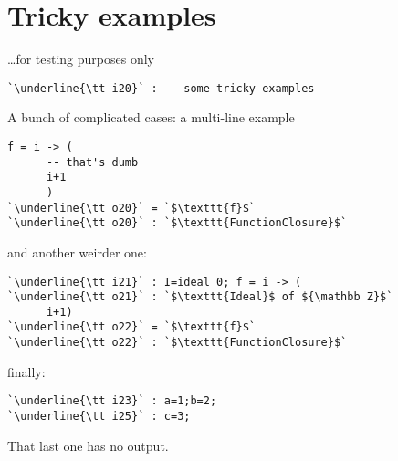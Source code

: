 \documentclass[12pt,a4paper]{amsart}
\begin{document}
\section{Tricky examples}
\dots for testing purposes only
\begin{lstlisting}[language=Macaulay2output]
`\underline{\tt i20}` : -- some tricky examples
\end{lstlisting}
A bunch of complicated cases: a multi-line example
\begin{lstlisting}[language=Macaulay2output]
      f = i -> (
      -- that's dumb
      i+1
      )
`\underline{\tt o20}` = `$\texttt{f}$`
`\underline{\tt o20}` : `$\texttt{FunctionClosure}$`
\end{lstlisting}
and another weirder one:
\begin{lstlisting}[language=Macaulay2output]
`\underline{\tt i21}` : I=ideal 0; f = i -> (
`\underline{\tt o21}` : `$\texttt{Ideal}$ of ${\mathbb Z}$`
      i+1)
`\underline{\tt o22}` = `$\texttt{f}$`
`\underline{\tt o22}` : `$\texttt{FunctionClosure}$`
\end{lstlisting}
finally:
\begin{lstlisting}[language=Macaulay2output]
`\underline{\tt i23}` : a=1;b=2;
`\underline{\tt i25}` : c=3;
\end{lstlisting}
That last one has no output.
\end{document}
